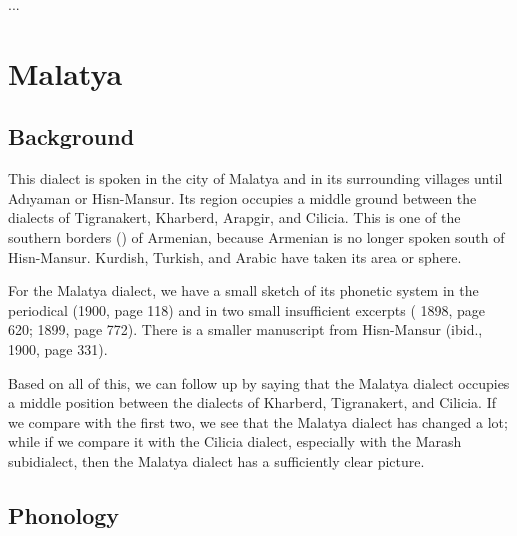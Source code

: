 ...

\fussy


\chapter{Malatya} \label{chapter:Malatya}
\section{Background}
\begin{adjarianpage}\label{page:196}\end{adjarianpage}%


This dialect is spoken in the city of Malatya and in its surrounding villages until Adıyaman or Hisn-Mansur. Its region occupies a middle ground between the dialects of Tigranakert, Kharberd, Arapgir, and Cilicia. This is one of the southern borders () of Armenian, because Armenian is no longer spoken south of Hisn-Mansur. Kurdish, Turkish, and Arabic have taken its area or sphere. 

For the Malatya dialect, we have a small sketch of its phonetic system in the periodical  (1900, page 118) and in two small insufficient excerpts ( 1898, page 620; 1899, page 772). There is a smaller manuscript from Hisn-Mansur (ibid., 1900, page 331).

Based on all of this, we can follow up by saying that the Malatya dialect occupies a middle position between the dialects of Kharberd, Tigranakert, and Cilicia. If we compare with the first two, we see that the Malatya dialect has changed a lot; while if we compare it with the Cilicia dialect, especially with the Marash subidialect, then the Malatya dialect has a sufficiently clear picture. 


\section{Phonology}
